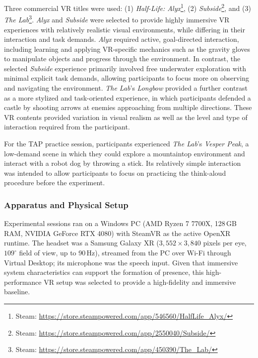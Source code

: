 Three commercial VR titles were used: (1) \textit{Half-Life: Alyx}\footnote{Steam: \url{https://store.steampowered.com/app/546560/HalfLife_Alyx/}}, (2) \textit{Subside}\footnote{Steam: \url{https://store.steampowered.com/app/2550040/Subside/}}, and (3) \textit{The Lab}\footnote{Steam: \url{https://store.steampowered.com/app/450390/The_Lab/}}.
\textit{Alyx} and \textit{Subside} were selected to provide highly immersive VR experiences with relatively realistic visual environments, while differing in their interaction and task demands. 
\textit{Alyx} required active, goal-directed interaction, including learning and applying VR-specific mechanics such as the gravity gloves to manipulate objects and progress through the environment. 
In contrast, the selected \textit{Subside} experience primarily involved free underwater exploration with minimal explicit task demands, allowing participants to focus more on observing and navigating the environment. 
\textit{The Lab}'s \textit{Longbow} provided a further contrast as a more stylized and task-oriented experience, in which participants defended a castle by shooting arrows at enemies approaching from multiple directions. 
These VR contents provided variation in visual realism as well as the level and type of interaction required from the participant.



For the TAP practice session, participants experienced \textit{The Lab}'s \textit{Vesper Peak}, a low-demand scene in which they could explore a mountaintop environment and interact with a robot dog by throwing a stick. Its relatively simple interaction was intended to allow participants to focus on practicing the think-aloud procedure before the experiment.


\subsubsection{{Apparatus and Physical Setup}}

Experimental sessions ran on a Windows PC (AMD Ryzen 7 7700X, 128\,GB RAM, NVIDIA GeForce RTX 4080) with SteamVR as the active OpenXR runtime. The headset was a Samsung Galaxy XR ($3{,}552 \times 3{,}840$ pixels per eye, $109^{\circ}$ field of view, up to 90\,Hz), streamed from the PC over Wi-Fi through Virtual Desktop; its microphone was the speech input.
Given that immersive system characteristics can support the formation of presence, this high-performance VR setup was selected to provide a high-fidelity and immersive baseline.

